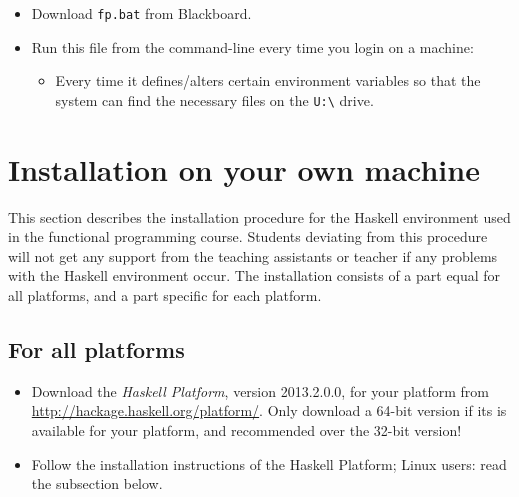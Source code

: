 \documentclass[]{article}
\begin{document}
\begin{itemize}
  \item Download \texttt{fp.bat} from Blackboard.
  \item Run this file from the command-line every time you login on a machine:
    \begin{itemize}
      \item Every time it defines/alters certain environment variables so that the system can find the necessary files on the \texttt{U:\textbackslash{}} drive.
    \end{itemize}
\end{itemize}

\section{Installation on your own machine}
This section describes the installation procedure for the Haskell environment used in the functional programming course.
Students deviating from this procedure will not get any support from the teaching assistants or teacher if any problems with the Haskell environment occur.
The installation consists of a part equal for all platforms, and a part specific for each platform.

\subsection{For all platforms}
\begin{itemize}
  \item Download the \emph{Haskell Platform}, version 2013.2.0.0, for your platform from \url{http://hackage.haskell.org/platform/}. Only download a 64-bit version if its is available for your platform, and recommended over the 32-bit version!
  \item Follow the installation instructions of the Haskell Platform; Linux users: read the subsection below.
\end{itemize}
\end{document}
